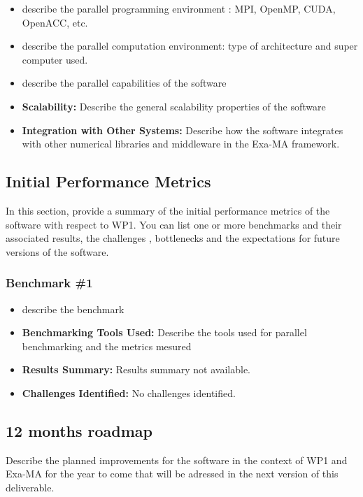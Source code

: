 \begin{itemize}
    \item describe the parallel programming  environment : MPI, OpenMP, CUDA, OpenACC, etc.
    \item describe the parallel computation environment: type of architecture and super computer used.
    \item describe the parallel capabilities of the software
    \item \textbf{Scalability:} Describe the general scalability properties of the software
    \item \textbf{Integration with Other Systems:} Describe how the software integrates with other numerical libraries and middleware in the Exa-MA framework.
\end{itemize}

\subsection{Initial Performance Metrics}
\label{sec:WP1:Feel++:metrics}

In this section, provide a summary of the initial performance metrics of the software with respect to WP1.
You can list one or more benchmarks and their associated results, the challenges , bottlenecks and the expectations for future versions of the software.



\subsubsection{Benchmark \#1}
\begin{itemize}
    \item describe the benchmark
    \item \textbf{Benchmarking Tools Used:} Describe the tools used for parallel benchmarking and the metrics mesured
    \item \textbf{Results Summary:} Results summary not available.
    \item \textbf{Challenges Identified:} No challenges identified.
\end{itemize}

\subsection{12 months roadmap}
\label{sec:WP1:Feel++:roadmap}

Describe the planned improvements  for the software in the context of WP1 and Exa-MA for the year to come that will be adressed in the next version of this deliverable.